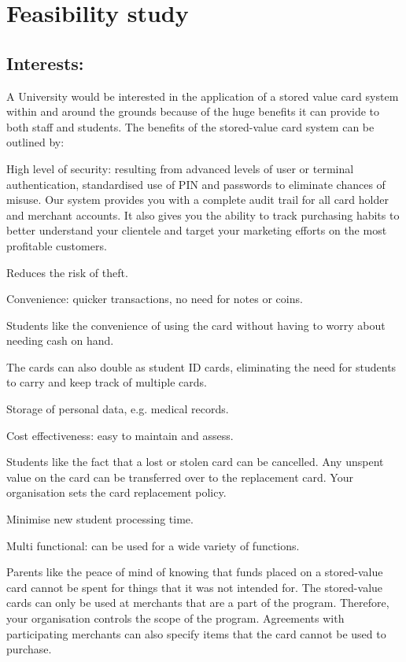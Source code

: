 \section{Feasibility study}

\subsection{Interests:}
A University would be interested in the application of a stored value card
system within and around the grounds because of the huge benefits it can
provide to both staff and students. The benefits of the stored-value card
system can be outlined by: 

\items High level of security: resulting from advanced levels of user or
terminal authentication, standardised use of PIN and passwords to eliminate
chances of misuse. Our system provides you with a complete audit trail for all
card holder and merchant accounts. It also gives you the ability to track
purchasing habits to better understand your clientele and target your marketing
efforts on the most profitable customers.

\subitems Reduces the risk of theft. 

\items Convenience: quicker transactions, no need for notes or coins. 

\subitems Students like the convenience of using the card without having to
worry about needing cash on hand. 

\subitems The cards can also double as student ID cards, eliminating the need
for students to carry and keep track of multiple cards. 

\subitems Storage of personal data, e.g. medical records.

\items Cost effectiveness: easy to maintain and assess. 

\subitems Students like the fact that a lost or stolen card can be cancelled.
Any unspent value on the card can be transferred over to the replacement card.
Your organisation sets the card replacement policy.

\subitems Minimise new student processing time.

\items Multi functional: can be used for a wide variety of functions.

\subitems Parents like the peace of mind of knowing that funds placed on a
stored-value card cannot be spent for things that it was not intended for. The
stored-value cards can only be used at merchants that are a part of the
program. Therefore, your organisation controls the scope of the program.
Agreements with participating merchants can also specify items that the card
cannot be used to purchase.


